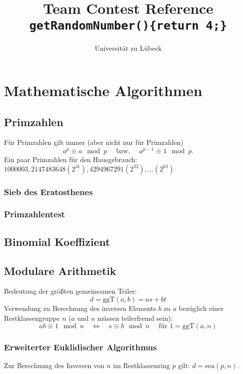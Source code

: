 \documentclass[10pt,a4paper,ngerman]{article}
\title{Team Contest Reference\\ \texttt{getRandomNumber()\{return 4;\}}}
\author{Universität zu Lübeck}
\begin{document}
\lstset{
    basicstyle=\ttfamily\footnotesize,
    numbers=left,
    numberstyle=\tiny,
    tabsize=2,
    numbersep=5pt,
    columns=flexible
}
\maketitle\thispagestyle{fancy}

\tableofcontents

\section{Mathematische Algorithmen}
\subsection{Primzahlen}
Für Primzahlen gilt immer (aber nicht nur für Primzahlen)
\[a^p\equiv a\mod p \quad\text{ bzw. }\quad a^{p-1}\equiv 1 \mod p.\]
Ein paar Primzahlen für den Hausgebrauch: $1000003, 2147483648 (2^{31}), 4294967291 (2^{32}), …(2^{63})$
\subsubsection{Sieb des Eratosthenes}

\subsubsection{Primzahlentest}

\subsection{Binomial Koeffizient}

\subsection{Modulare Arithmetik}
Bedeutung der größten gemeinsamen Teiler:
\[ d = \text{ggT}(a,b) = as+bt \]
Verwendung zu Berechnung des inversen Elements $b$ zu $a$ bezüglich einer Restklassengruppe $n$ ($a$ und $n$ müssen teilerfremd sein):
\[ ab\equiv 1 \mod n\quad\Leftrightarrow\quad s\equiv b \mod n\quad\text{ für }1=\text{ggT}(a,n)\]
\subsubsection{Erweiterter Euklidischer Algorithmus}

Zur Berechnung des Inversen von $n$ im Restklassenring $p$ gilt: $d = \mathrm{eea}(p,n)$.
\end{document}
